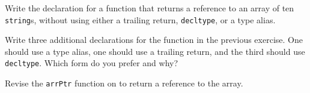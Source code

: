 %
%
\begin{question}
Write the declaration for a function that returns a reference
to an array of ten \verb|string|s, without using either a trailing return,
\verb|decltype|, or a type alias.
\end{question}

\begin{question}
Write three additional declarations for the function in the
previous exercise. One should use a type alias, one should use a trailing
return, and the third should use \verb|decltype|. Which form do you prefer and
why?
\end{question}

\begin{question}
Revise the \verb|arrPtr| function on to return a reference to the
array.
\end{question}
